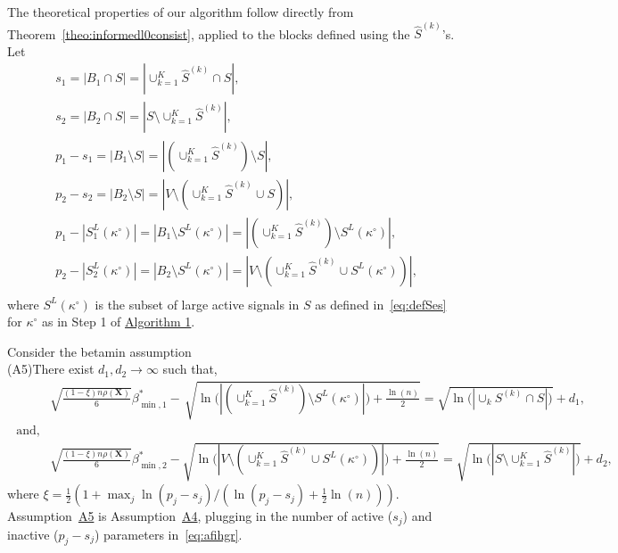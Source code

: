 \documentclass[
  12pt]{article}
\newcommand{\bX}{\mathbf{X}}
\begin{document}
The theoretical properties of our algorithm
follow directly from Theorem~\ref{theo:informedl0consist}, applied to the blocks defined using the $\hat{S}^{(k)}$'s. Let
\begin{equation}\label{eq:afihgr}
\begin{aligned}
   & s_1 = |B_1 \cap S| = |\cup_{k=1}^K\hat S^{(k)}\cap S|,\\
   & s_2 = |B_2 \cap S| = |S\setminus \cup_{k=1}^K  \hat S^{(k)}|,\\
   & p_1-s_1 = |B_1 \setminus S| = |(\cup_{k=1}^K\hat S^{(k)})\setminus S |,\\
   & p_2-s_2 = |B_2 \setminus S| = |V \setminus (\cup_{k=1}^K \hat S^{(k)}\cup S)|,\\
   & p_1-|S_1^L(\kappa^{\circ})| = |B_1 \setminus S^L(\kappa^{\circ})| = |(\cup_{k=1}^K\hat S^{(k)})\setminus S^L(\kappa^{\circ}) |,\\
   & p_2-|S_2^L(\kappa^{\circ})| = |B_2 \setminus S^L(\kappa^{\circ})| = |V \setminus (\cup_{k=1}^K \hat S^{(k)}\cup S^L(\kappa^{\circ}))|,\\
\end{aligned} 
\end{equation}
where $S^L(\kappa^{\circ})$ is the subset of large active signals in $S$ as defined in~\eqref{eq:defSes} for $\kappa^{\circ}$ as in Step 1 of \hyperlink{lab:AlgoAIS}{Algorithm 1}.  

Consider the betamin assumption\\
\hypertarget{lab:A5}{(A5)}\quad There exist $d_1,d_2\to \infty$ such that,
\begin{align*}
        &\sqrt{\frac{ (1-\xi)n\rho(\bX)}{6}}\beta_{\min,1}^*- \,\sqrt{\ln\big(|(\cup_{k=1}^K\hat S^{(k)})\setminus S^L(\kappa^{\circ})|\big)+\frac{\ln(n)}{2}}= \sqrt{\ln\big(|\cup_{k} S^{(k)}\cap S|\big)} + d_1,\\\text{ and,}\\
    &\sqrt{\frac{ (1-\xi)n\rho(\bX)}{6}}\beta_{\min,2}^*- \sqrt{\ln\big(|V \setminus (\cup_{k=1}^K \hat S^{(k)}\cup S^L(\kappa^{\circ}))|\big)+\frac{\ln(n)}{2}}= \sqrt{\ln\big(|S\setminus \cup_{k=1}^K  \hat S^{(k)}|\big)} + d_2,
\end{align*} where $\xi=\tfrac12(1+\max_j \ln(p_j-s_j)/(\ln(p_j-s_j)+\tfrac12\ln(n)))$.
Assumption~\hyperlink{lab:A5}{A5} is Assumption~\hyperlink{lab:A4}{A4}, plugging in the number of active ($s_j$) and inactive ($p_j-s_j$) parameters in~\eqref{eq:afihgr}.
\end{document}
